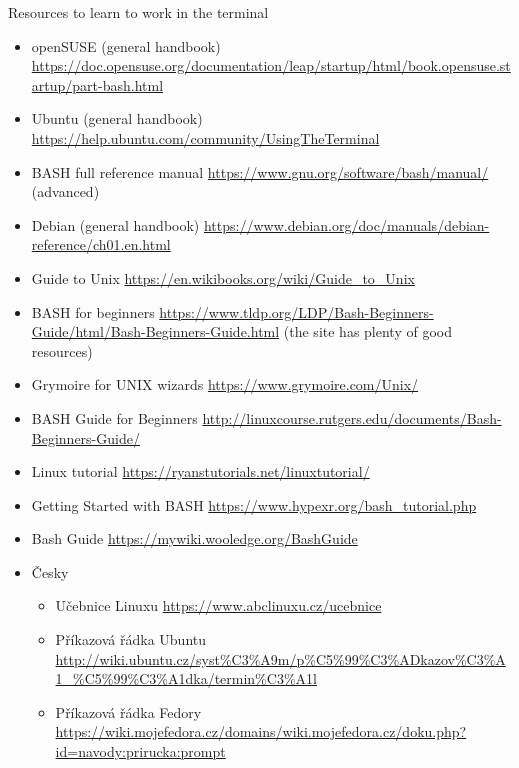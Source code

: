 \documentclass[compress, ucs, xelatex, 11pt, xcolor=svgnames, aspectratio=169,
	hyperref={
		bookmarks=true,
		unicode=true,
		colorlinks=true,
		pdftitle={Linux, command line and MetaCentrum},
		plainpages=false,
		pdfauthor={Vojtech Zeisek},
		pdfsubject={Course about use of Linux command line, writing shell scripts and using MetaCentrum of CESNET},
		pdfcreator={XeLaTeX},
		pdfkeywords={Linux, GNU, BASH, shell, command line, MetaCentrum},
		linkcolor=DarkRed, %
		anchorcolor=DarkBlue, %
		citecolor=Indigo, %
		filecolor=NavyBlue, %
		menucolor=DarkMagenta, %
		urlcolor=DarkBlue, %
		pdftex},
	url={hyphens, lowtilde} %
	]{beamer}
\begin{document}
\begin{frame}[allowframebreaks]{Resources to learn to work in the terminal}
	\begin{itemize}
		\item openSUSE (general handbook) \url{https://doc.opensuse.org/documentation/leap/startup/html/book.opensuse.startup/part-bash.html}
		\item Ubuntu (general handbook) \url{https://help.ubuntu.com/community/UsingTheTerminal}
		\item BASH full reference manual \url{https://www.gnu.org/software/bash/manual/} (advanced)
		\item Debian (general handbook) \url{https://www.debian.org/doc/manuals/debian-reference/ch01.en.html}
		\item Guide to Unix \url{https://en.wikibooks.org/wiki/Guide_to_Unix}
		\item BASH for beginners \url{https://www.tldp.org/LDP/Bash-Beginners-Guide/html/Bash-Beginners-Guide.html} (the site has plenty of good resources)
		\item Grymoire for UNIX wizards \url{https://www.grymoire.com/Unix/}
		\item BASH Guide for Beginners \url{http://linuxcourse.rutgers.edu/documents/Bash-Beginners-Guide/}
		\item Linux tutorial \url{https://ryanstutorials.net/linuxtutorial/}
		\item Getting Started with BASH \url{https://www.hypexr.org/bash_tutorial.php}
		\item Bash Guide \url{https://mywiki.wooledge.org/BashGuide}
		\item Česky
		\begin{itemize}
			\item Učebnice Linuxu \url{https://www.abclinuxu.cz/ucebnice}
			\item Příkazová řádka Ubuntu \url{http://wiki.ubuntu.cz/syst\%C3\%A9m/p\%C5\%99\%C3\%ADkazov\%C3\%A1_\%C5\%99\%C3\%A1dka/termin\%C3\%A1l}
			\item Příkazová řádka Fedory \url{https://wiki.mojefedora.cz/domains/wiki.mojefedora.cz/doku.php?id=navody:prirucka:prompt}
		\end{itemize}
	\end{itemize}
\end{frame}
\end{document}

